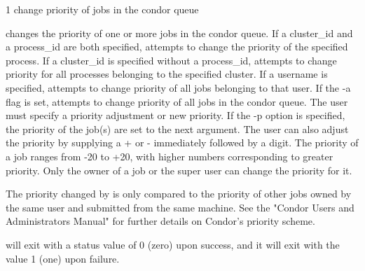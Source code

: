 \begin{ManPage}{\label{man-condor-prio}}{1}
{change priority of jobs in the condor queue} 
\Synopsis {}


\Description

 changes the priority of one or more jobs in the condor
queue.
If a cluster\_id and a process\_id are both specified, 
attempts to change the priority of the specified process.
If a cluster\_id is specified without a process\_id, 
attempts to change priority for all processes belonging to the
specified cluster.
If a username is specified,  attempts to change priority
of all jobs belonging to that user.
If the -a flag is set,  attempts to change priority of
all jobs in the condor queue.
The user must specify a priority adjustment or new priority. 
If the -p option is specified, the priority of the job(s) are set to
the next argument.
The user can also adjust the priority by supplying a + or -
immediately followed by a digit.
The priority of a job ranges from -20 to +20, with higher numbers
corresponding to greater priority.
Only the owner of a job or the super user can change the priority for
it.

The priority changed by  is only compared to the priority
of other jobs owned by the same user and submitted from the same
machine.
See the "Condor Users and Administrators Manual" for further details
on Condor's priority scheme.

\begin{Options}
\end{Options}

\ExitStatus

 will exit with a status value of 0 (zero) upon success,
and it will exit with the value 1 (one) upon failure.

\end{ManPage}
